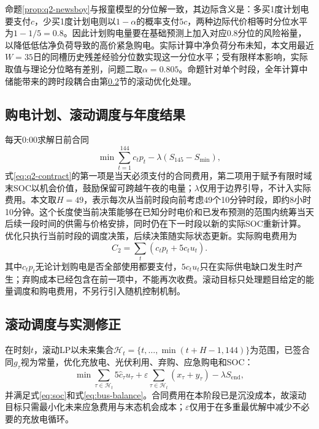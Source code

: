 \documentclass[UTF8,12pt,a4paper]{ctexart}
\theoremstyle{remark}
\begin{document}
命题\ref{prop:q2-newsboy}与报童模型的分位解一致\cite{khouja1999singleperiod,petruzzi1999pricing}，其边际含义是：多买1度计划电要支付$c$，少买1度计划电则以$1-\alpha$的概率支付$5c$，两种边际代价相等时分位水平为$1-1/5=0.8$。因此计划购电量要在基础预测上加入对应$0.8$分位的风险裕量，以降低低估净负荷导致的高价紧急购电。实际计算中净负荷分布未知，本文用最近$W=35$日的同槽历史残差经验分位数实现这一分位水平；受有限样本影响，实际取值与理论分位略有差别，问题二取$\alpha=0.805$。命题针对单个时段，全年计算中储能带来的跨时段耦合由第\ref{subsec:q2-rolling}节的滚动优化处理。

\subsection{购电计划、滚动调度与年度结果}
每天0:00求解日前合同
\begin{equation}\min\sum_{t=1}^{144}c_tp_t-\lambda(S_{145}-S_{\min}),\label{eq:q2-contract}\end{equation}
式\eqref{eq:q2-contract}的第一项是当天必须支付的合同费用，第二项用于赋予有限时域末SOC以机会价值，鼓励保留可跨越午夜的电量；$\lambda$仅用于边界引导，不计入实际费用。本文取$H=49$，表示每次从当前时段向前考虑49个10分钟时段，即约8小时10分钟。这个长度使当前决策能够在已知分时电价和已发布预测的范围内统筹当天后续一段时间的供需与价格安排，同时仍在下一时段以新的实际SOC重新计算。优化只执行当前时段的调度决策，后续决策随实际状态更新。实际购电费用为
\begin{equation}C_2=\sum_t(c_tp_t+5c_tu_t).\label{eq:q2-cash}\end{equation}
其中$c_tp_t$无论计划购电是否全部使用都要支付，$5c_tu_t$只在实际供电缺口发生时产生；弃购成本已经包含在前一项中，不能再次收费。滚动目标只处理题目给定的能量调度和购电费用，不另行引入随机控制机制。

\subsection{滚动调度与实测修正}\label{subsec:q2-rolling}
在时刻$t$，滚动LP以未来集合$\mathcal H_t=\{t,\ldots,\min(t+H-1,144)\}$为范围，已签合同$g_\tau$视为常量，优化充放电、光伏利用、弃购、应急购电和SOC：
\begin{equation}
\min \sum_{\tau\in\mathcal H_t}5\widehat c_\tau u_\tau
+\varepsilon\sum_{\tau\in\mathcal H_t}(x_\tau+y_\tau)-\lambda S_{\mathrm{end}},
\label{eq:rolling-obj}
\end{equation}
并满足式\eqref{eq:soc}和式\eqref{eq:bus-balance}。合同费用在本阶段已是沉没成本，故滚动目标只需最小化未来应急费用与末态机会成本；$\varepsilon$仅用于在多重最优解中减少不必要的充放电循环。
\end{document}
